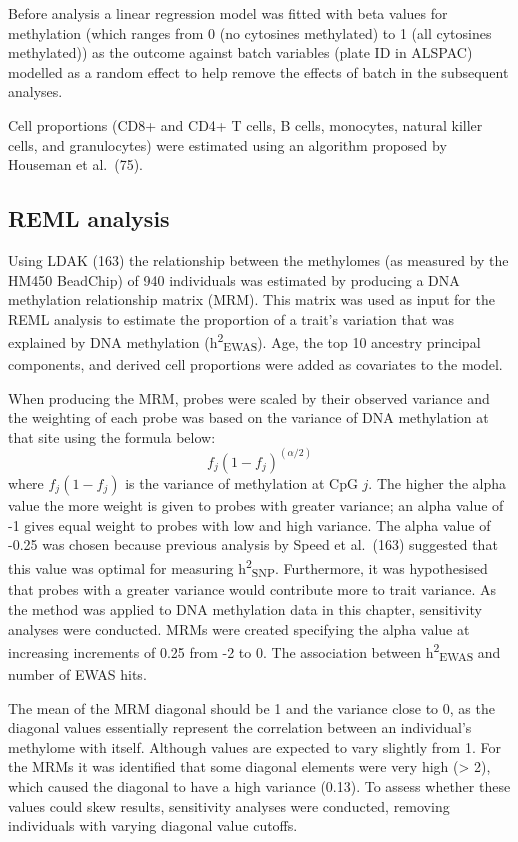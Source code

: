 \documentclass[11pt,oneside]{bristolthesis}
\begin{document}
Before analysis a linear regression model was fitted with beta values for methylation (which ranges from 0 (no cytosines methylated) to 1 (all cytosines methylated)) as the outcome against batch variables (plate ID in ALSPAC) modelled as a random effect to help remove the effects of batch in the subsequent analyses.

Cell proportions (CD8+ and CD4+ T cells, B cells, monocytes, natural killer cells, and granulocytes) were estimated using an algorithm proposed by Houseman et al.~(75).

\hypertarget{reml-analysis}{%
\subsection{REML analysis}\label{reml-analysis}}

Using LDAK (163) the relationship between the methylomes (as measured by the HM450 BeadChip) of 940 individuals was estimated by producing a DNA methylation relationship matrix (MRM). This matrix was used as input for the REML analysis to estimate the proportion of a trait's variation that was explained by DNA methylation (h\textsuperscript{2}\textsubscript{EWAS}). Age, the top 10 ancestry principal components, and derived cell proportions were added as covariates to the model.

When producing the MRM, probes were scaled by their observed variance and the weighting of each probe was based on the variance of DNA methylation at that site using the formula below:
\begin{equation}
    f_{j}(1-f_{j})^{(\alpha/2)}
    \label{eq:mrm-weights}
\end{equation}
where \(f_j(1-f_j)\) is the variance of methylation at CpG \(j\). The higher the alpha value the more weight is given to probes with greater variance; an alpha value of -1 gives equal weight to probes with low and high variance. The alpha value of -0.25 was chosen because previous analysis by Speed et al.~(163) suggested that this value was optimal for measuring h\textsuperscript{2}\textsubscript{SNP}. Furthermore, it was hypothesised that probes with a greater variance would contribute more to trait variance. As the method was applied to DNA methylation data in this chapter, sensitivity analyses were conducted. MRMs were created specifying the alpha value at increasing increments of 0.25 from -2 to 0. The association between h\textsuperscript{2}\textsubscript{EWAS} and number of EWAS hits.

The mean of the MRM diagonal should be 1 and the variance close to 0, as the diagonal values essentially represent the correlation between an individual's methylome with itself. Although values are expected to vary slightly from 1. For the MRMs it was identified that some diagonal elements were very high (\textgreater{} 2), which caused the diagonal to have a high variance (0.13). To assess whether these values could skew results, sensitivity analyses were conducted, removing individuals with varying diagonal value cutoffs.
\end{document}
